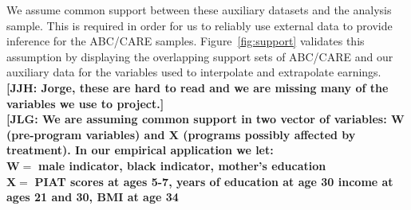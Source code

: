 \noindent We assume common support between these auxiliary datasets and the analysis sample. This is required in order for us to reliably use external data to provide inference for the ABC/CARE samples. Figure~\ref{fig:support} validates this assumption by displaying the overlapping support sets of ABC/CARE and our auxiliary data for the variables used to interpolate and extrapolate earnings.  \\

\noindent \textbf{[JJH: Jorge, these are hard to read and we are missing many of the variables we use to project.]} \\
\textbf{[JLG: We are assuming common support in two vector of variables: W (pre-program variables) and X (programs possibly affected by treatment). In our empirical application we let:} \\

\noindent $\mathbf{W =}$ \textbf{male indicator, black indicator, mother's education} \\
\noindent $\mathbf{X =} $ \textbf{PIAT scores at ages 5-7, years of education at age 30 income at ages 21 and 30, BMI at age 34}


